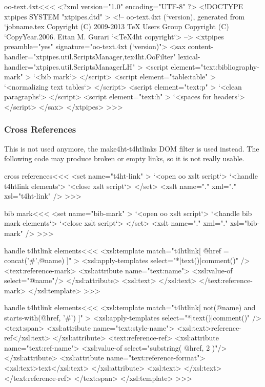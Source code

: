 \documentclass{article}
\begin{document}






\<oo-text.4xt\><<<
<?xml version="1.0" encoding="UTF-8" ?>
<!DOCTYPE xtpipes SYSTEM "xtpipes.dtd" >
<!-- oo-text.4xt (`version), generated from `jobname.tex
     Copyright (C) 2009-2013 TeX Users Group
     Copyright (C) `CopyYear.2006. Eitan M. Gurari
`<TeX4ht copyright`> -->
<xtpipes preamble="yes" signature="oo-text.4xt (`version)">
   <sax content-handler="xtpipes.util.ScriptsManager,tex4ht.OoFilter" 
        lexical-handler="xtpipes.util.ScriptsManagerLH" >
      <script element="text:bibliography-mark" >
         `<bib mark`>
      </script> 
      <script element="table:table" >
         `<normalizing text tables`>
      </script> 
      <script element="text:p" >
         `<clean paragraphs`>
      </script> 
      <script element="text:h" >
         `<spaces for headers`>
      </script> 
   </sax>
</xtpipes>
>>>


\subsubsection{Cross References}

This is not used anymore, the make4ht-t4htlinks DOM filter is used instead. The
following code may produce broken or empty links, so it is not really usable.

\<cross references\><<<
<set name="t4ht-link" >
   `<open oo xslt script`>
    `<handle t4htlink elements`>
   `<close xslt script`>
</set>
<xslt name="." xml="." xsl="t4ht-link" />
>>>

\<bib mark\><<<
<set name="bib-mark" >
   `<open oo xslt script`>
    `<handle bib mark elements`>
   `<close xslt script`>
</set>
<xslt name="." xml="." xsl="bib-mark" />
>>>



\<handle t4htlink elements\><<<
<xsl:template match="t4htlink[ @href = concat('#',@name) ]" >
  <xsl:apply-templates select="*|text()|comment()" />
  <text:reference-mark>
     <xsl:attribute name="text:name">
        <xsl:value-of select="@name"/>
     </xsl:attribute>
     <xsl:text> </xsl:text>
  </text:reference-mark>
</xsl:template> 
>>>

\<handle t4htlink elements\><<<
<xsl:template match="t4htlink[ not(@name) 
                           and
                               starts-with(@href, '#') 
]" >
  <xsl:apply-templates select="*|text()|comment()" />
   <text:span>
        <xsl:attribute name="text:style-name">
           <xsl:text>reference-ref</xsl:text>
        </xsl:attribute>
     <text:reference-ref>
        <xsl:attribute name="text:ref-name">
           <xsl:value-of select="substring( @href, 2 )"/>
        </xsl:attribute>
        <xsl:attribute name="text:reference-format">
           <xsl:text>text</xsl:text>
        </xsl:attribute>
        <xsl:text> </xsl:text>   
     </text:reference-ref>
   </text:span>
</xsl:template> 
>>>
\end{document}
